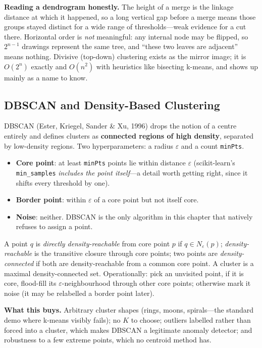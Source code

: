 \textbf{Reading a dendrogram honestly.} The height of a merge is the linkage distance at which it happened, so a long vertical gap before a merge means those groups stayed distinct for a wide range of thresholds---weak evidence for a cut there. Horizontal order is \emph{not} meaningful: any internal node may be flipped, so $2^{n-1}$ drawings represent the same tree, and ``these two leaves are adjacent'' means nothing. Divisive (top-down) clustering exists as the mirror image; it is $O(2^n)$ exactly and $O(n^2)$ with heuristics like bisecting k-means, and shows up mainly as a name to know.

\subsection{DBSCAN and Density-Based Clustering}

DBSCAN (Ester, Kriegel, Sander \& Xu, 1996) drops the notion of a centre entirely and defines clusters as \textbf{connected regions of high density}, separated by low-density regions. Two hyperparameters: a radius $\varepsilon$ and a count \texttt{minPts}.

\begin{itemize}
    \item \textbf{Core point}: at least \texttt{minPts} points lie within distance $\varepsilon$ (scikit-learn's \texttt{min\_samples} \emph{includes the point itself}---a detail worth getting right, since it shifts every threshold by one).
    \item \textbf{Border point}: within $\varepsilon$ of a core point but not itself core.
    \item \textbf{Noise}: neither. DBSCAN is the only algorithm in this chapter that natively refuses to assign a point.
\end{itemize}
A point $q$ is \emph{directly density-reachable} from core point $p$ if $q \in N_\varepsilon(p)$; \emph{density-reachable} is the transitive closure through core points; two points are \emph{density-connected} if both are density-reachable from a common core point. A cluster is a maximal density-connected set. Operationally: pick an unvisited point, if it is core, flood-fill its $\varepsilon$-neighbourhood through other core points; otherwise mark it noise (it may be relabelled a border point later).

\textbf{What this buys.} Arbitrary cluster shapes (rings, moons, spirals---the standard demo where k-means visibly fails); no $K$ to choose; outliers labelled rather than forced into a cluster, which makes DBSCAN a legitimate anomaly detector; and robustness to a few extreme points, which no centroid method has.

